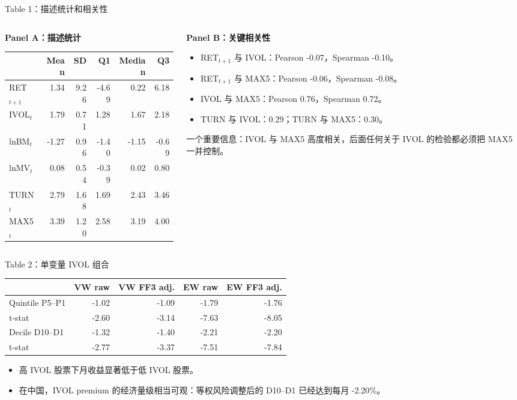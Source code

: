\documentclass[aspectratio=169,10pt]{beamer}
\newcommand{\tighttable}{\scriptsize\setlength{\tabcolsep}{3pt}\renewcommand{\arraystretch}{1.12}}
\begin{document}
\begin{frame}{Table 1：描述统计和相关性}
	\begin{columns}[t]
		\begin{column}{0.48\textwidth}
			\textbf{Panel A：描述统计}
			\scriptsize
			\begin{tabular}{lrrrrr}
				\toprule
				& Mean & SD & Q1 & Median & Q3\\
				\midrule
				RET$_{t+1}$ & 1.34 & 9.26 & -4.69 & 0.22 & 6.18\\
				IVOL$_t$ & 1.79 & 0.71 & 1.28 & 1.67 & 2.18\\
				lnBM$_t$ & -1.27 & 0.96 & -1.40 & -1.15 & -0.69\\
				lnMV$_t$ & 0.08 & 0.54 & -0.39 & 0.02 & 0.80\\
				TURN$_t$ & 2.79 & 1.68 & 1.69 & 2.43 & 3.46\\
				MAX5$_t$ & 3.39 & 1.20 & 2.58 & 3.19 & 4.00\\
				\bottomrule
			\end{tabular}
		\end{column}
		\begin{column}{0.52\textwidth}
			\textbf{Panel B：关键相关性}
			\scriptsize
			\begin{itemize}
				\item RET$_{t+1}$ 与 IVOL：Pearson -0.07，Spearman -0.10。
				\item RET$_{t+1}$ 与 MAX5：Pearson -0.06，Spearman -0.08。
				\item IVOL 与 MAX5：Pearson 0.76，Spearman 0.72。
				\item TURN 与 IVOL：0.29；TURN 与 MAX5：0.30。
			\end{itemize}
			\par\vspace{4pt}
			\small 一个重要信息：IVOL 与 MAX5 高度相关，后面任何关于 IVOL 的检验都必须把 MAX5 一并控制。
		\end{column}
	\end{columns}
\end{frame}

\begin{frame}{Table 2：单变量 IVOL 组合}
	\tighttable
	\begin{tabular}{lrrrr}
		\toprule
		& VW raw & VW FF3 adj. & EW raw & EW FF3 adj.\\
		\midrule
		Quintile P5--P1 & -1.02 & -1.09 & -1.79 & -1.76\\
		t-stat & -2.60 & -3.14 & -7.63 & -8.05\\
		Decile D10--D1 & -1.32 & -1.40 & -2.21 & -2.20\\
		t-stat & -2.77 & -3.37 & -7.51 & -7.84\\
		\bottomrule
	\end{tabular}
	\vspace{6pt}
	\begin{itemize}
		\item 高 IVOL 股票下月收益显著低于低 IVOL 股票。
		\item 在中国，IVOL premium 的经济量级相当可观：等权风险调整后的 D10--D1 已经达到每月 -2.20\%。
	\end{itemize}
\end{frame}
\end{document}
